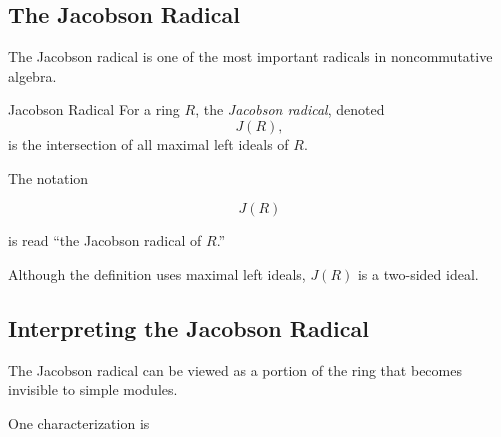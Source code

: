 \begin{center}
\end{center}

\subsection{The Jacobson Radical}
\label{subsec:jacobson-radical}

The Jacobson radical is one of the most important radicals in
noncommutative algebra.

\begin{definitionbox}{Jacobson Radical}
For a ring \(R\), the \emph{Jacobson radical}, denoted
\[ J(R), \]
is the intersection of all maximal left ideals of \(R\).
\end{definitionbox}

The notation

\[ J(R) \]

is read ``the Jacobson radical of \(R\).''

Although the definition uses maximal left ideals, \(J(R)\) is a two-sided
ideal.

\subsection{Interpreting the Jacobson Radical}
\label{subsec:jacobson-radical-meaning}

The Jacobson radical can be viewed as a portion of the ring that becomes
invisible to simple modules.

One characterization is

